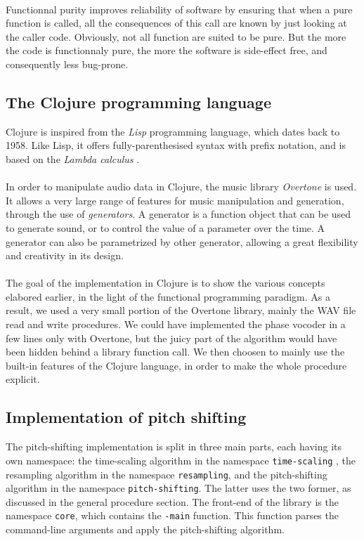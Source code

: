 \documentclass[letterpaper]{article}
\newcommand*{\codeinl}{\texttt}
\theoremstyle{definition}
\theoremstyle{remark}
\begin{document}
\paragraph{}
Functionnal purity improves reliability of software by ensuring that when a pure
function is called, all the consequences of this call are known by just looking
at the caller code. Obviously, not all function are suited to be pure. But the
more the code is functionnaly pure, the more the software is side-effect free,
and consequently less bug-prone.

\subsection{The Clojure programming language}
Clojure is inspired from the \emph{Lisp} programming language, which dates back
to 1958. Like Lisp, it offers fully-parenthesised syntax with prefix notation,
and is based on the \emph{Lambda calculus} \citep{Rojas_atutorial}.

\paragraph{}
In order to manipulate audio data in Clojure, the music library \emph{Overtone}
is used. It allows a very large range of features for music manipulation and
generation, through the use of \emph{generators}. A generator is a function
object that can be used to generate sound, or to control the value of a
parameter over the time. A generator can also be parametrized by other
generator, allowing a great flexibility and creativity in its design.

\paragraph{}
The goal of the implementation in Clojure is to show the various concepts
elabored earlier, in the light of the functional programming paradigm. As a
result, we used a very small portion of the Overtone library, mainly the WAV
file read and write procedures. We could have implemented the phase vocoder in a
few lines only with Overtone, but the juicy part of the algorithm would have
been hidden behind a library function call. We then choosen to mainly use the
built-in features of the Clojure language, in order to make the whole procedure
explicit.

\subsection{Implementation of pitch shifting}
The pitch-shifting implementation is split in three main parts, each having its
own namespace: the time-scaling algorithm in the namespace
\codeinl{time-scaling} , the resampling algorithm in the namespace
\codeinl{resampling}, and the pitch-shifting algorithm in the namespace
\codeinl{pitch-shifting}. The latter uses the two former, as discussed in the
general procedure section. The front-end of the library is the namespace
\codeinl{core}, which contains the \codeinl{-main} function. This function
parses the command-line arguments and apply the pitch-shifting algorithm.
\end{document}
